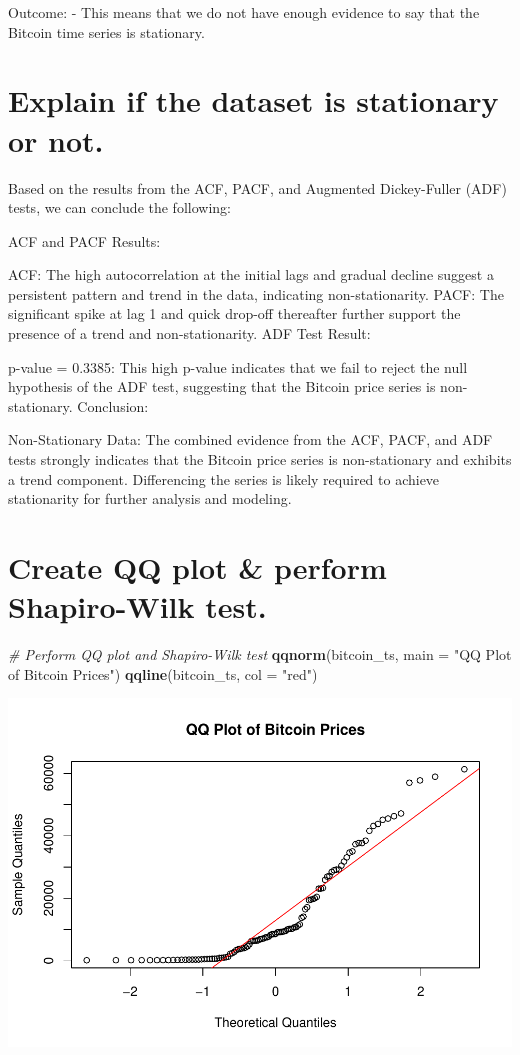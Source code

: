 \documentclass[
]{book}
\newenvironment{Shaded}{\begin{snugshade}}{\end{snugshade}}
\newcommand{\AttributeTok}[1]{\textcolor[rgb]{0.13,0.29,0.53}{#1}}
\newcommand{\CommentTok}[1]{\textcolor[rgb]{0.56,0.35,0.01}{\textit{#1}}}
\newcommand{\FunctionTok}[1]{\textcolor[rgb]{0.13,0.29,0.53}{\textbf{#1}}}
\newcommand{\NormalTok}[1]{#1}
\newcommand{\StringTok}[1]{\textcolor[rgb]{0.31,0.60,0.02}{#1}}
\begin{document}
Outcome:
- This means that we do not have enough evidence to say that the Bitcoin time series is stationary.

\section{Explain if the dataset is stationary or not.}\label{explain-if-the-dataset-is-stationary-or-not.}

Based on the results from the ACF, PACF, and Augmented Dickey-Fuller (ADF) tests, we can conclude the following:

ACF and PACF Results:

ACF: The high autocorrelation at the initial lags and gradual decline suggest a persistent pattern and trend in the data, indicating non-stationarity.
PACF: The significant spike at lag 1 and quick drop-off thereafter further support the presence of a trend and non-stationarity.
ADF Test Result:

p-value = 0.3385: This high p-value indicates that we fail to reject the null hypothesis of the ADF test, suggesting that the Bitcoin price series is non-stationary.
Conclusion:

Non-Stationary Data: The combined evidence from the ACF, PACF, and ADF tests strongly indicates that the Bitcoin price series is non-stationary and exhibits a trend component. Differencing the series is likely required to achieve stationarity for further analysis and modeling.

\section{Create QQ plot \& perform Shapiro-Wilk test.}\label{create-qq-plot-perform-shapiro-wilk-test.}

\begin{Shaded}
\begin{Highlighting}[]
\CommentTok{\# Perform QQ plot and Shapiro{-}Wilk test}
\FunctionTok{qqnorm}\NormalTok{(bitcoin\_ts, }\AttributeTok{main =} \StringTok{"QQ Plot of Bitcoin Prices"}\NormalTok{)}
\FunctionTok{qqline}\NormalTok{(bitcoin\_ts, }\AttributeTok{col =} \StringTok{"red"}\NormalTok{)}
\end{Highlighting}
\end{Shaded}

\includegraphics{bookdown-demo_files/figure-latex/unnamed-chunk-37-1.pdf}
\end{document}
